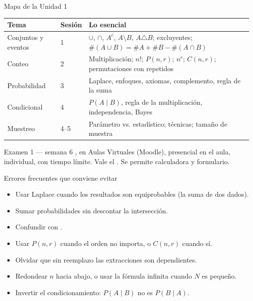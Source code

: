 \documentclass[aspectratio=169,10pt]{beamer}
\begin{document}
\begin{frame}{Mapa de la Unidad 1}
  \scriptsize
  \begin{center}
  \begin{tabular}{@{}llp{6.6cm}@{}}
    \toprule
    \textbf{Tema} & \textbf{Sesión} & \textbf{Lo esencial} \\
    \midrule
    Conjuntos y eventos & 1 & $\cup$, $\cap$, $A^{c}$, $A\setminus B$,
      $A\triangle B$; excluyentes; $\#(A\cup B)=\#A+\#B-\#(A\cap B)$ \\
    Conteo & 2 & Multiplicación; $n!$; $P(n,r)$; $n^{r}$; $C(n,r)$;
      permutaciones con repetidos \\
    Probabilidad & 3 & Laplace, enfoques, axiomas, complemento, regla de la suma \\
    Condicional & 4 & $P(A\mid B)$, regla de la multiplicación, independencia,
      Bayes \\
    Muestreo & 4--5 & Parámetro vs. estadístico; técnicas; tamaño de muestra \\
    \bottomrule
  \end{tabular}
  \end{center}

  \vspace{0.2cm}
  \begin{alertblock}{Examen 1 — semana 6}
    \footnotesize
    , en Aulas Virtuales (Moodle), presencial
    en el aula, individual, con tiempo límite. Vale el .
    Se permite calculadora y formulario.
  \end{alertblock}
\end{frame}

\begin{frame}{Errores frecuentes que conviene evitar}
  \small
  \begin{itemize}
    \item Usar Laplace cuando los resultados  son equiprobables (la
          suma de dos dados).
    \item Sumar probabilidades sin descontar la intersección.
    \item Confundir  con .
    \item Usar $P(n,r)$ cuando el orden no importa, o $C(n,r)$ cuando sí.
    \item Olvidar que sin reemplazo las extracciones son dependientes.
    \item Redondear $n$ hacia abajo, o usar la fórmula infinita cuando $N$ es
          pequeño.
    \item Invertir el condicionamiento: $P(A\mid B)$ no es $P(B\mid A)$.
  \end{itemize}
\end{frame}
\end{document}
